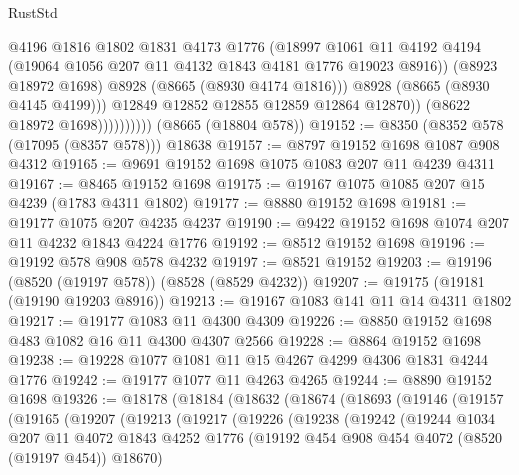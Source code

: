 \begin{lexlean}{RustStd}
\begin{coremodule}
                              @4196
                              @1816
                              @1802
                              @1831
                              @4173
                              @1776
                              (@18997
                                @1061
                                @11
                                @4192
                                @4194
                                (@19064 @1056 @207 @11 @4132 @1843 @4181 @1776 @19023 @8916))
                              (@8923 @18972 @1698)
                              @8928
                              (@8665 (@8930 @4174 @1816)))
                            @8928
                            (@8665 (@8930 @4145 @4199)))
                          @12849
                          @12852
                          @12855
                          @12859
                          @12864
                          @12870))
                      (@8622 @18972 @1698))))))))))
    (@8665 (@18804 @578))
@19152 := @8350 (@8352 @578 (@17095 (@8357 @578))) @18638
@19157 := @8797 @19152 @1698 @1087 @908 @4312
@19165 := @9691 @19152 @1698 @1075 @1083 @207 @11 @4239 @4311
@19167 := @8465 @19152 @1698
@19175 := @19167 @1075 @1085 @207 @15 @4239 (@1783 @4311 @1802)
@19177 := @8880 @19152 @1698
@19181 := @19177 @1075 @207 @4235 @4237
@19190 := @9422 @19152 @1698 @1074 @207 @11 @4232 @1843 @4224 @1776
@19192 := @8512 @19152 @1698
@19196 := @19192 @578 @908 @578 @4232
@19197 := @8521 @19152
@19203 := @19196 (@8520 (@19197 @578)) (@8528 (@8529 @4232))
@19207 := @19175 (@19181 (@19190 @19203 @8916))
@19213 := @19167 @1083 @141 @11 @14 @4311 @1802
@19217 := @19177 @1083 @11 @4300 @4309
@19226 := @8850 @19152 @1698 @483 @1082 @16 @11 @4300 @4307 @2566
@19228 := @8864 @19152 @1698
@19238 := @19228 @1077 @1081 @11 @15 @4267 @4299 @4306 @1831 @4244 @1776
@19242 := @19177 @1077 @11 @4263 @4265
@19244 := @8890 @19152 @1698
@19326 := @18178
    (@18184
      (@18632
        (@18674
          (@18693
            (@19146
              (@19157
                (@19165
                  (@19207
                    (@19213
                      (@19217
                        (@19226
                          (@19238
                            (@19242
                              (@19244
                                @1034
                                @207
                                @11
                                @4072
                                @1843
                                @4252
                                @1776
                                (@19192 @454 @908 @454 @4072 (@8520 (@19197 @454)) @18670)

\end{coremodule}
\end{lexlean}
